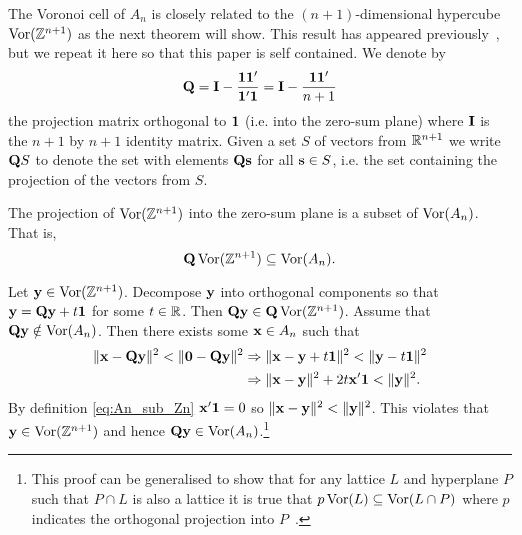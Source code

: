 \documentclass[journal, onecolumn, 11pt]{IEEEtran}
\begin{document}
The Voronoi cell of $A_n$ is closely related to the $(n+1)$-dimensional hypercube $\operatorname{Vor}({\mathbb Z}^{n+1})$ as the next theorem will show.  This result has appeared previously~\cite{McKilliam2009CoxeterLattices,McKilliam2010thesis}, but we repeat it here so that this paper is self contained.  We denote by
\[
\mathbf{Q} = \mathbf{I} - \frac{\boldsymbol{1}\boldsymbol{1}^\prime}{\boldsymbol{1}^\prime \boldsymbol{1}} = \mathbf{I} - \frac{\boldsymbol{1}\boldsymbol{1}^\prime}{n+1}
\]
the projection matrix orthogonal to $\boldsymbol{1}$ (i.e. into the zero-sum plane) where $\mathbf{I}$ is the $n+1$ by $n+1$ identity matrix.  Given a set $S$ of vectors from ${\mathbb R}^{n+1}$ we write $\mathbf{Q} S$  to denote the set with elements $\mathbf{Q} \mathbf{s}$ for all $\mathbf{s} \in S$, i.e. the set containing the projection of the vectors from $S$.

\begin{lemma} \label{lem:QVorZnsubsetVorAn}
The projection of $\operatorname{Vor}({\mathbb Z}^{n+1})$ into the zero-sum plane is a subset of $\operatorname{Vor}(A_{n})$.  That is,
\[
\mathbf{Q}\operatorname{Vor}({\mathbb Z}^{n+1}) \subseteq \operatorname{Vor}(A_{n}).
\]
\end{lemma}
\begin{IEEEproof}
Let $\mathbf{y} \in \operatorname{Vor}({\mathbb Z}^{n+1})$.  Decompose $\mathbf{y}$ into orthogonal components so that $\mathbf{y} = \mathbf{Q} \mathbf{y} + t \boldsymbol{1}$ for some $t \in {\mathbb R}$.  Then $\mathbf{Q}\mathbf{y} \in \mathbf{Q}\operatorname{Vor}({\mathbb Z}^{n+1})$.  Assume that $\mathbf{Q}\mathbf{y} \notin \operatorname{Vor}(A_n)$.  Then there exists some $\mathbf{x} \in A_n$ such that
\begin{align*}
\|\mathbf{x} - \mathbf{Q}\mathbf{y}\|^2 < \|\boldsymbol{0} - \mathbf{Q}\mathbf{y}\|^2 & \Rightarrow \|\mathbf{x} - \mathbf{y} + t\boldsymbol{1}\|^2 < \|\mathbf{y} - t\boldsymbol{1}\|^2 \\
& \Rightarrow \|\mathbf{x} - \mathbf{y}\|^2 + 2t\mathbf{x}'\boldsymbol{1} < \|\mathbf{y}\|^2.
\end{align*}
By definition \eqref{eq:An_sub_Zn} $\mathbf{x}'\boldsymbol{1} = 0$ so $\|\mathbf{x} - \mathbf{y}\|^2 < \|\mathbf{y}\|^2$.  This violates that $\mathbf{y} \in \operatorname{Vor}({\mathbb Z}^{n+1})$ and hence $\mathbf{Q}\mathbf{y} \in \operatorname{Vor}(A_n)$.\footnote{This proof can be generalised to show that for any lattice $L$ and hyperplane $P$ such that $P\cap L$ is also a lattice it is true that $p\operatorname{Vor}(L) \subseteq \operatorname{Vor}(L \cap P)$ where $p$ indicates the orthogonal projection into $P$~\cite[Lemma~2.1]{McKilliam2010thesis}.}
\end{IEEEproof}
\end{document}
